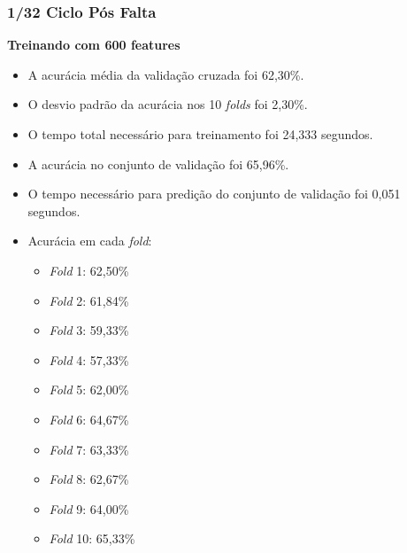 \subsubsection{1/32 Ciclo Pós Falta}
\textbf{Treinando com 600 features}
\begin{itemize}
    \item A acurácia média da validação cruzada foi 62,30\%.
    \item O desvio padrão da acurácia nos 10 \textit{folds} foi 2,30\%.
    \item O tempo total necessário para treinamento foi 24,333 segundos.
    \item A acurácia no conjunto de validação foi 65,96\%.
    \item O tempo necessário para predição do conjunto de validação foi 0,051 segundos.
    \item Acurácia em cada \textit{fold}:
    \begin{itemize}
        \item \textit{Fold} 1: 62,50\%
        \item \textit{Fold} 2: 61,84\%
        \item \textit{Fold} 3: 59,33\%
        \item \textit{Fold} 4: 57,33\%
        \item \textit{Fold} 5: 62,00\%
        \item \textit{Fold} 6: 64,67\%
        \item \textit{Fold} 7: 63,33\%
        \item \textit{Fold} 8: 62,67\%
        \item \textit{Fold} 9: 64,00\%
        \item \textit{Fold} 10: 65,33\%
    \end{itemize}
\end{itemize}

